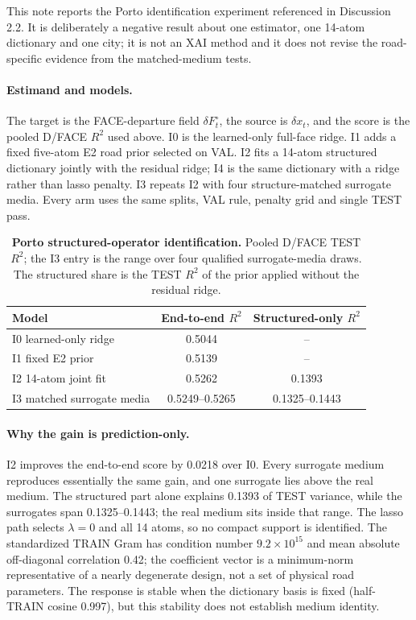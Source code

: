 
This note reports the Porto identification experiment referenced in Discussion 2.2. It is deliberately a negative result about one estimator, one 14-atom dictionary and one city; it is not an XAI method and it does not revise the road-specific evidence from the matched-medium tests.

\paragraph{Estimand and models.} The target is the FACE-departure field $\delta F_t^\circ$, the source is $\delta x_t$, and the score is the pooled D/FACE $R^2$ used above. I0 is the learned-only full-face ridge. I1 adds a fixed five-atom E2 road prior selected on VAL. I2 fits a 14-atom structured dictionary jointly with the residual ridge; I4 is the same dictionary with a ridge rather than lasso penalty. I3 repeats I2 with four structure-matched surrogate media. Every arm uses the same splits, VAL rule, penalty grid and single TEST pass.

\begin{table}[!htbp]
\centering\small
\caption{\textbf{Porto structured-operator identification.} Pooled D/FACE TEST $R^2$; the I3 entry is the range over four qualified surrogate-media draws. The structured share is the TEST $R^2$ of the prior applied without the residual ridge.}
\label{tab:supp-identification}
\begin{tabular}{lcc}
\toprule
Model & End-to-end $R^2$ & Structured-only $R^2$ \\
\midrule
I0 learned-only ridge & 0.5044 & -- \\
I1 fixed E2 prior & 0.5139 & -- \\
I2 14-atom joint fit & 0.5262 & 0.1393 \\
I3 matched surrogate media & 0.5249--0.5265 & 0.1325--0.1443 \\
\bottomrule
\end{tabular}
\end{table}

\paragraph{Why the gain is prediction-only.} I2 improves the end-to-end score by 0.0218 over I0. Every surrogate medium reproduces essentially the same gain, and one surrogate lies above the real medium. The structured part alone explains 0.1393 of TEST variance, while the surrogates span 0.1325--0.1443; the real medium sits inside that range. The lasso path selects $\lambda=0$ and all 14 atoms, so no compact support is identified. The standardized TRAIN Gram has condition number $9.2\times10^{15}$ and mean absolute off-diagonal correlation 0.42; the coefficient vector is a minimum-norm representative of a nearly degenerate design, not a set of physical road parameters. The response is stable when the dictionary basis is fixed (half-TRAIN cosine 0.997), but this stability does not establish medium identity.

